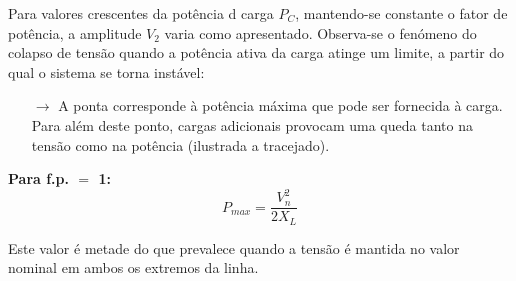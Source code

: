 \noindent\begin{minipage}[c]{0.45\linewidth}
    \noindent Para valores crescentes da potência d carga $P_C$, mantendo-se constante o fator de potência, a amplitude $V_2$ varia como apresentado. Observa-se o fenómeno do colapso de tensão quando a potência ativa da carga atinge um limite, a partir do qual o sistema se torna instável:

    \begin{itemize}[leftmargin=*]
        \item[$\rightarrow$] A ponta corresponde à potência máxima que pode ser fornecida à carga. Para além deste ponto, cargas adicionais provocam uma queda tanto na tensão como na potência (ilustrada a tracejado).
    \end{itemize}

    \noindent \textbf{Para f.p. $\pmb{=}$ 1:}
    $$
        \boxed{P_{max} = \frac{V_n^2}{2 X_L}}
    $$

    \noindent Este valor é metade do que prevalece quando a tensão é mantida no valor nominal em ambos os extremos da linha.
\end{minipage}\hfill
\begin{minipage}[c]{0.5\linewidth}
\begin{figure}[H]
    \centering
\end{figure} 
\end{minipage}
\clearpage
